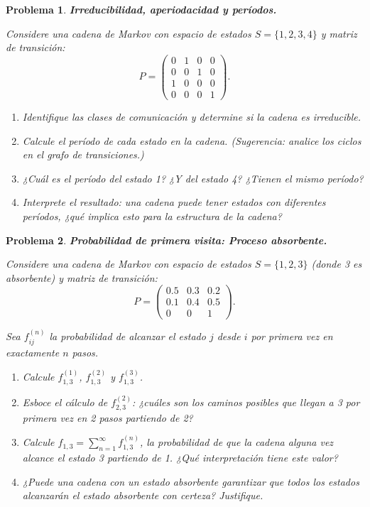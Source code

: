 \documentclass[12pt]{article}
\newtheorem{problem}{Problema}
\begin{document}
\begin{problem}
\textbf{Irreducibilidad, aperiodacidad y períodos.}

Considere una cadena de Markov con espacio de estados $S = \{1, 2, 3, 4\}$ y matriz de transición:
\[
P = \begin{pmatrix}
0 & 1 & 0 & 0 \\
0 & 0 & 1 & 0 \\
1 & 0 & 0 & 0 \\
0 & 0 & 0 & 1
\end{pmatrix}.
\]

\begin{enumerate}
    \item[(a)] Identifique las clases de comunicación y determine si la cadena es irreducible.
    
    \item[(b)] Calcule el período de cada estado en la cadena. (Sugerencia: analice los ciclos en el grafo de transiciones.)
    
    \item[(c)] ¿Cuál es el período del estado 1? ¿Y del estado 4? ¿Tienen el mismo período?
    
    \item[(d)] Interprete el resultado: una cadena puede tener estados con diferentes períodos, ¿qué implica esto para la estructura de la cadena?
\end{enumerate}
\end{problem}

\begin{problem}
\textbf{Probabilidad de primera visita: Proceso absorbente.}

Considere una cadena de Markov con espacio de estados $S = \{1, 2, 3\}$ (donde 3 es absorbente) y matriz de transición:
\[
P = \begin{pmatrix}
0.5 & 0.3 & 0.2 \\
0.1 & 0.4 & 0.5 \\
0 & 0 & 1
\end{pmatrix}.
\]

Sea $f_{ij}^{(n)}$ la probabilidad de alcanzar el estado $j$ desde $i$ por primera vez en exactamente $n$ pasos.

\begin{enumerate}
    \item[(a)] Calcule $f_{1,3}^{(1)}$, $f_{1,3}^{(2)}$ y $f_{1,3}^{(3)}$.
    
    \item[(b)] Esboce el cálculo de $f_{2,3}^{(2)}$: ¿cuáles son los caminos posibles que llegan a 3 por primera vez en 2 pasos partiendo de 2?
    
    \item[(c)] Calcule $f_{1,3} = \sum_{n=1}^{\infty} f_{1,3}^{(n)}$, la probabilidad de que la cadena alguna vez alcance el estado 3 partiendo de 1. ¿Qué interpretación tiene este valor?
    
    \item[(d)] ¿Puede una cadena con un estado absorbente garantizar que todos los estados alcanzarán el estado absorbente con certeza? Justifique.
\end{enumerate}
\end{problem}
\end{document}
